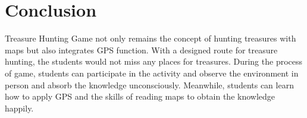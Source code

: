 \chapter{Conclusion }

Treasure Hunting Game not only remains the concept of hunting treasures with maps but also integrates GPS function. With a designed route for treasure hunting, the students would not miss any places for treasures. During the process of game, students can participate in the activity and observe the environment in person and absorb the knowledge unconsciously. Meanwhile, students can learn how to apply GPS and the skills of reading maps to obtain the knowledge happily.


